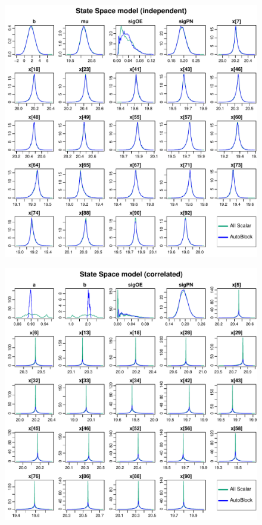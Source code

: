 \documentclass{article}
\begin{document}
\begin{figure}[h]
\centerline{\includegraphics[scale=1.0]{StateSpacemodelindependent}}
\end{figure}
\thispagestyle{empty}
\clearpage

\begin{figure}[h]
\centerline{\includegraphics[scale=1.0]{StateSpacemodelcorrelated}}
\end{figure}
\thispagestyle{empty}
\clearpage
\end{document}
